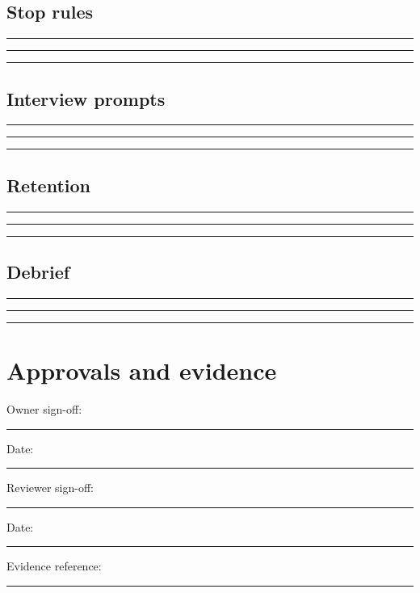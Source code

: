 \documentclass[11pt]{article}
\begin{document}
\subsection{Stop rules}
\noindent\rule{\linewidth}{0.3pt}\par\vspace{0.18in}
\noindent\rule{\linewidth}{0.3pt}\par\vspace{0.18in}
\noindent\rule{\linewidth}{0.3pt}\par\vspace{0.14in}

\subsection{Interview prompts}
\noindent\rule{\linewidth}{0.3pt}\par\vspace{0.18in}
\noindent\rule{\linewidth}{0.3pt}\par\vspace{0.18in}
\noindent\rule{\linewidth}{0.3pt}\par\vspace{0.14in}

\subsection{Retention}
\noindent\rule{\linewidth}{0.3pt}\par\vspace{0.18in}
\noindent\rule{\linewidth}{0.3pt}\par\vspace{0.18in}
\noindent\rule{\linewidth}{0.3pt}\par\vspace{0.14in}

\subsection{Debrief}
\noindent\rule{\linewidth}{0.3pt}\par\vspace{0.18in}
\noindent\rule{\linewidth}{0.3pt}\par\vspace{0.18in}
\noindent\rule{\linewidth}{0.3pt}\par\vspace{0.14in}

\section{Approvals and evidence}
\noindent Owner sign-off: \rule{0.42\linewidth}{0.4pt}\hfill Date: \rule{0.19\linewidth}{0.4pt}\par\vspace{0.4cm}
\noindent Reviewer sign-off: \rule{0.40\linewidth}{0.4pt}\hfill Date: \rule{0.19\linewidth}{0.4pt}\par\vspace{0.4cm}
\noindent Evidence reference: \rule{0.70\linewidth}{0.4pt}
\end{document}
